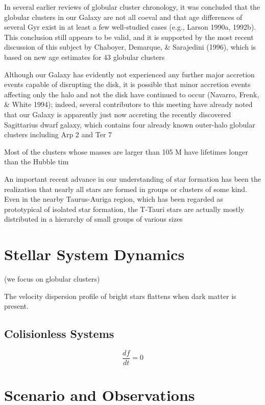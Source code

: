In several earlier reviews of globular cluster chronology, it was concluded that the globular clusters in our Galaxy are not all coeval and that age differences of several Gyr exist in at least a few well-studied cases (e.g., Larson 1990a, 1992b). This conclusion still appears to be valid, and it is supported by the most recent discussion of this subject by Chaboyer, Demarque, \& Sarajedini (1996), which is based on new age estimates for 43 globular clusters


 Although our Galaxy has evidently not experienced any further major accretion events capable of disrupting the disk, it is possible that minor accretion events affecting only the halo and not the disk have continued to occur (Navarro, Frenk, \& White 1994); indeed, several contributors to this meeting have already noted that our Galaxy is apparently just now accreting the recently discovered Sagittarius dwarf galaxy, which contains four already known outer-halo globular clusters including Arp 2 and Ter 7 

Most of the clusters
whose masses are larger than 105 M have lifetimes longer than the Hubble tim

An important recent advance in our understanding of star formation has
been the realization that nearly all stars are formed in groups or clusters of
some kind. Even in the nearby Taurus-Auriga region, which has been regarded
as prototypical of isolated star formation, the T-Tauri stars are actually mostly
distributed in a hierarchy of small groups of various sizes 



\section{Stellar System Dynamics}

(we focus on globular clusters)

The velocity dispersion profile of bright stars flattens when dark matter is present.

\subsection{Colisionless Systems}

\begin{equation}
\dfrac{df}{dt}=0
\end{equation}


\section{Scenario and Observations}


